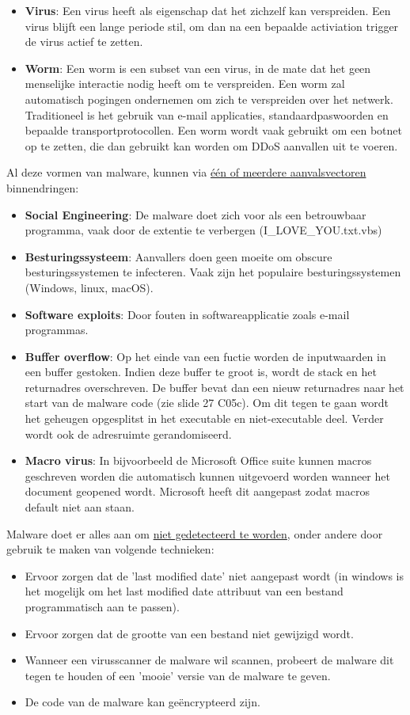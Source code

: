 \documentclass{report}
\begin{document}
\begin{itemize}
		\item \textbf{Virus}: Een virus heeft als eigenschap dat het zichzelf kan verspreiden. Een virus blijft een lange periode stil, om dan na een bepaalde activiation trigger de virus actief te zetten.
		\item \textbf{Worm}: Een worm is een subset van een virus, in de mate dat het geen menselijke interactie nodig heeft om te verspreiden. Een worm zal automatisch pogingen ondernemen om zich te verspreiden over het netwerk. Traditioneel is het gebruik van e-mail applicaties, standaardpaswoorden en bepaalde transportprotocollen. Een worm wordt vaak gebruikt om een botnet op te zetten, die dan gebruikt kan worden om DDoS aanvallen uit te voeren.
	\end{itemize}

	Al deze vormen van malware, kunnen via \underline{één of meerdere aanvalsvectoren} binnendringen:
	\begin{itemize}
		\item \textbf{Social Engineering}: De malware doet zich voor als een betrouwbaar programma, vaak door de extentie te verbergen (I\_LOVE\_YOU.txt.vbs)
		\item \textbf{Besturingssysteem}: Aanvallers doen geen moeite om obscure besturingssystemen te infecteren. Vaak zijn het populaire besturingssystemen (Windows, linux, macOS).
		\item \textbf{Software exploits}: Door fouten in softwareapplicatie zoals e-mail programmas.
		\item \textbf{Buffer overflow}: Op het einde van een fuctie worden de inputwaarden in een buffer gestoken. Indien deze buffer te groot is, wordt de stack en het returnadres overschreven. De buffer bevat dan een nieuw returnadres naar het start van de malware code (zie slide 27 C05c). Om dit tegen te gaan wordt het geheugen opgesplitst in het executable en niet-executable deel. Verder wordt ook de adresruimte gerandomiseerd.
		\item \textbf{Macro virus}: In bijvoorbeeld de Microsoft Office suite kunnen macros geschreven worden die automatisch kunnen uitgevoerd worden wanneer het document geopened wordt. Microsoft heeft dit aangepast zodat macros default niet aan staan.  
	\end{itemize}

	Malware doet er alles aan om \underline{niet gedetecteerd te worden}, onder andere door gebruik te maken van volgende technieken:
	\begin{itemize}
		\item Ervoor zorgen dat de 'last modified date' niet aangepast wordt (in windows is het mogelijk om het last modified date attribuut van een bestand programmatisch aan te passen).
		\item Ervoor zorgen dat de grootte van een bestand niet gewijzigd wordt. 
		\item Wanneer een virusscanner de malware wil scannen, probeert de malware dit tegen te houden of een 'mooie' versie van de malware te geven.
		\item De code van de malware kan geëncrypteerd zijn.
	\end{itemize}
\end{document}
